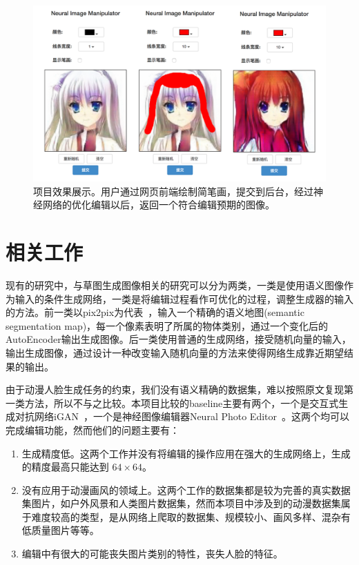 \documentclass[a4paper,12pt,UTF8]{ctexart}
\newcommand{\kai}{\CJKfamily{zhkai}}	%
\begin{document}
\begin{figure}[H]
  \centering
  \includegraphics[width=0.9\linewidth]{figs/frontend.png}
  \caption{\kai 项目效果展示。用户通过网页前端绘制简笔画，提交到后台，经过神经网络的优化编辑以后，返回一个符合编辑预期的图像。}
  \label{fig:frontend}
\end{figure}


\section{相关工作}


现有的研究中，与草图生成图像相关的研究可以分为两类，一类是使用语义图像作为输入的条件生成网络，一类是将编辑过程看作可优化的过程，调整生成器的输入的方法。前一类以pix2pix为代表~\cite{isola2016image}，输入一个精确的语义地图(semantic segmentation map)，每一个像素表明了所属的物体类别，通过一个变化后的AutoEncoder输出生成图像。后一类使用普通的生成网络，接受随机向量的输入，输出生成图像，通过设计一种改变输入随机向量的方法来使得网络生成靠近期望结果的输出。

由于动漫人脸生成任务的约束，我们没有语义精确的数据集，难以按照原文复现第一类方法，所以不与之比较。本项目比较的baseline主要有两个，一个是交互式生成对抗网络iGAN~\cite{Zhu2016Generative}，一个是神经图像编辑器Neural Photo Editor~\cite{Brock2016Neural}。这两个均可以完成编辑功能，然而他们的问题主要有：

\begin{enumerate}
\item 生成精度低。这两个工作并没有将编辑的操作应用在强大的生成网络上，生成的精度最高只能达到 $64 \times 64$。
\item 没有应用于动漫画风的领域上。这两个工作的数据集都是较为完善的真实数据集图片，如户外风景和人类图片数据集，然而本项目中涉及到的动漫数据集属于难度较高的类型，是从网络上爬取的数据集、规模较小、画风多样、混杂有低质量图片等等。
\item 编辑中有很大的可能丧失图片类别的特性，丧失人脸的特征。
\end{enumerate}
\end{document}
